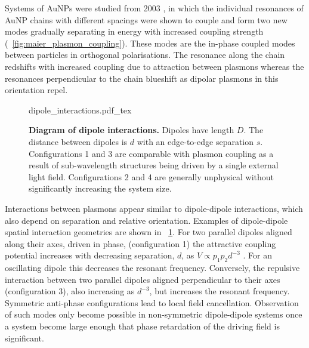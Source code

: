 \documentclass{article}
\begin{document}
Systems of AuNPs were studied from 2003 \cite{maier2002}, in which the individual resonances of AuNP chains with different spacings were shown to couple and form two new modes gradually separating in energy with increased coupling strength (\figurename~\ref{fig:maier_plasmon_coupling}). These modes are the in-phase coupled modes between particles in orthogonal polarisations. The resonance along the chain redshifts with increased coupling due to attraction between plasmons whereas the resonances perpendicular to the chain blueshift as dipolar plasmons in this orientation repel.

\begin{figure}
\vspace{-10pt}
\fontsize{10pt}{1em}\selectfont
\def\svgwidth{\textwidth}
{dipole_interactions.pdf_tex}
\caption[Diagram of dipole interactions]{\textbf{Diagram of dipole interactions.} Dipoles have length $D$. The distance between dipoles is $d$ with an edge-to-edge separation $s$. Configurations 1 and 3 are comparable with plasmon coupling as a result of sub-wavelength structures being driven by a single external light field. Configurations 2 and 4 are generally unphysical without significantly increasing the system size.}
\label{fig:dipole_interactions}
\vspace{-5pt}
\end{figure}

Interactions between plasmons appear similar to dipole-dipole interactions, which also depend on separation and relative orientation. Examples of dipole-dipole spatial interaction geometries are shown in \figurename~\ref{fig:dipole_interactions}. For two parallel dipoles aligned along their axes, driven in phase, (configuration 1) the attractive coupling potential increases with decreasing separation, $d$, as $V \propto p_1p_2d^{-3}$ \cite{halas2011}. For an oscillating dipole this decreases the resonant frequency. Conversely, the repulsive interaction between two parallel dipoles aligned perpendicular to their axes (configuration 3), also increasing as $d^{-3}$, but increases the resonant frequency. Symmetric anti-phase configurations lead to local field cancellation. Observation of such modes only become possible in non-symmetric dipole-dipole systems once a system become large enough that phase retardation of the driving field is significant.
\end{document}
